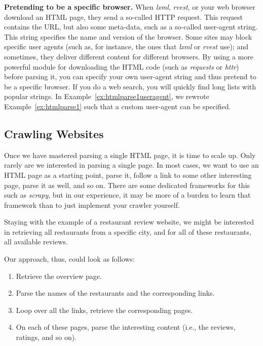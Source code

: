 


\begin{feature}\textbf{Pretending to be a specific browser.}  When \emph{lxml}, \emph{rvest}, or your web browser download an HTML page, they send a so-called HTTP request. This request contains the URL, but also some meta-data, such as a so-called user-agent string. This string specifies the name and version of the browser. Some sites may block specific user agents (such as, for instance, the ones that \emph{lxml} or \emph{rvest} use); and sometimes, they deliver different content for different browsers. By using a more powerful module for downloading the HTML code (such as \emph{requests} or \emph{httr}) before parsing it, you can specify your own user-agent string and thus pretend to be a specific browser. If you do a web search, you will quickly find long lists with popular strings. In Example~\ref{ex:htmlparse1useragent}, we rewrote Example~\ref{ex:htmlparse1} such that a custom user-agent can be specified.
\end{feature}





\subsection{Crawling Websites}\label{sec:crawling}

Once we have mastered parsing a single HTML page, it is time to scale
up. Only rarely are we interested in parsing a single page. In most
cases, we want to use an HTML page as a starting point, parse it,
follow a link to some other interesting page, parse it as well, and so
on. There are some dedicated frameworks for this such as \emph{scrapy},
but in our experience, it may be more of a burden to learn that
framework than to just implement your crawler yourself.

Staying with the example of a restaurant review website, we might be
interested in retrieving all restaurants from a specific city, and for
all of these restaurants, all available reviews.

Our approach, thus, could look as follows:

\begin{enumerate}
	\item Retrieve the overview page.
	\item Parse the names of the restaurants and the corresponding links.
	\item Loop over all the links, retrieve the corresponding pages.
	\item On each of these pages, parse the interesting content (i.e., the reviews, ratings, and so on).
\end{enumerate}

